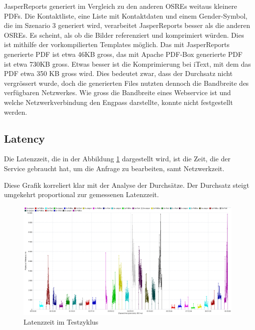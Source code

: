 \documentclass[main.tex]{subfiles}
\begin{document}
JasperReports generiert im Vergleich zu den anderen OSREs weitaus kleinere PDFs. Die Kontaktliste, eine Liste mit Kontaktdaten und einem Gender-Symbol, die im Szenario 3 generiert wird, verarbeitet JasperReports besser als die anderen OSREs. Es scheint, als ob die Bilder referenziert und komprimiert würden. Dies ist mithilfe der vorkompilierten Templates möglich. Das mit JasperReports generierte PDF ist etwa 46KB gross, das mit Apache PDF-Box generierte PDF ist etwa 730KB gross. Etwas besser ist die Komprimierung bei iText, mit dem das PDF etwa 350 KB gross wird. Dies bedeutet zwar, dass der Durchsatz nicht vergrössert wurde, doch die generierten Files nutzten dennoch die Bandbreite des verfügbaren Netzwerkes. Wie gross die Bandbreite eines Webservice ist und welche Netzwerkverbindung den Engpass darstellte, konnte nicht festgestellt werden. 


\subsection{Latency}

Die Latenzzeit, die in der Abbildung \ref{figure:latencyTestcycle} dargestellt wird, ist die Zeit, die der Service gebraucht hat, um die Anfrage zu bearbeiten, samt Netzwerkzeit. 

Diese Grafik korreliert klar mit der Analyse der Durchsätze. Der Durchsatz steigt umgekehrt proportional zur gemessenen Latenzzeit.

\begin{figure}[!ht]
\includegraphics[width=\textwidth]{mainpart/4_analyse_img/ResponseLatenciesOverTime.png}
 \caption{Latenzzeit im Testzyklus}
 \label{figure:latencyTestcycle}
\end{figure}
\end{document}
